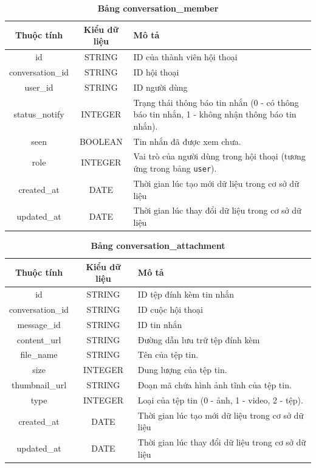 \begin{table}[H]
  \caption{\bfseries \fontsize{12pt}{0pt}\selectfont Bảng conversation\_member}
  \centering
  \begin{tabularx}{\textwidth}{|c|c|X|}
    \hline
    \textbf{Thuộc tính} & \textbf{Kiểu dữ liệu} & \textbf{Mô tả} \\
    \hline
    id & STRING & ID của thành viên hội thoại \\
    \hline
    conversation\_id & STRING & ID hội thoại \\
    \hline
    user\_id & STRING & ID người dùng  \\
    \hline
    status\_notify & INTEGER & Trạng thái thông báo tin nhắn (0 - có thông báo tin nhắn, 1 - không nhận thông báo tin nhắn).\\
    \hline
    seen & BOOLEAN & Tin nhắn đã được xem chưa.\\
    \hline
    role & INTEGER & Vai trò của người dùng trong hội thoại (tương ứng trong bảng \texttt{user}).\\
    \hline
    created\_at & DATE & Thời gian lúc tạo mới dữ liệu trong cơ sở dữ liệu \\
    \hline
    updated\_at & DATE & Thời gian lúc thay đổi dữ liệu trong cơ sở dữ liệu \\
    \hline
  \end{tabularx}
\end{table}


\begin{table}[H]
  \caption{\bfseries \fontsize{12pt}{0pt}\selectfont Bảng conversation\_attachment}
  \centering
  \begin{tabularx}{\textwidth}{|c|c|X|}
    \hline
    \textbf{Thuộc tính} & \textbf{Kiểu dữ liệu} & \textbf{Mô tả} \\
    \hline
    id & STRING & ID tệp đính kèm tin nhắn  \\
    \hline
    conversation\_id & STRING & ID cuộc hội thoại  \\
    \hline
    message\_id & STRING & ID tin nhắn  \\
    \hline
    content\_url & STRING & Đường dẫn lưu trữ tệp đính kèm\\
    \hline
    file\_name & STRING & Tên của tệp tin.\\
    \hline
    size & INTEGER & Dung lượng của tệp tin.\\
    \hline
    thumbnail\_url & STRING & Đoạn mã chứa hình ảnh tĩnh của tệp tin.\\
    \hline
    type & INTEGER & Loại của tệp tin (0 - ảnh, 1 - video, 2 - tệp). \\
    \hline
    created\_at & DATE & Thời gian lúc tạo mới dữ liệu trong cơ sở dữ liệu \\
    \hline
    updated\_at & DATE & Thời gian lúc thay đổi dữ liệu trong cơ sở dữ liệu \\
    \hline
  \end{tabularx}
\end{table}


